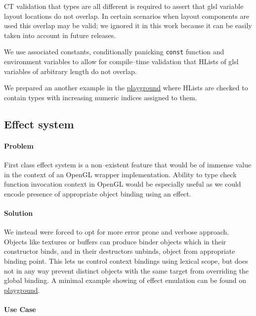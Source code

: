 CT validation that types are all different is required to assert that glsl variable layout locations do not overlap.
In certain scenarios when layout components are used this overlap may be valid; we ignored it in this work because it can be easily taken into account in future releases.

We use associated constants, conditionally panicking \texttt{const} function and environment variables to allow for compile--time validation that HLists of glsl variables 
of arbitrary length do not overlap.

We prepared an another example in the \href{https://play.rust-lang.org/?version=stable&mode=debug&edition=2021&gist=61baf4a1043d947594ef33d03bb8390b}{playground} where
HLists are checked to contain types with increasing numeric indices assigned to them.

\subsection{Effect system}

\paragraph{Problem}

First class effect system is a non--existent feature that would be of immense value in the context of an OpenGL wrapper implementation.
Ability to type check function invocation context in OpenGL would be especially useful as we could encode presence of appropriate object binding using an effect.

\paragraph{Solution}

We instead were forced to opt for more error prone and verbose approach.
Objects like textures or buffers can produce binder objects which in their constructor binds, and in their destructors unbinds, object from appropriate binding point.
This lets us control context bindings using lexical scope, but does not in any way prevent distinct objects with the same target from overriding the global binding.
A minimal example showing of effect emulation can be found on \href{https://play.rust-lang.org/?version=stable&mode=debug&edition=2021&gist=3724852e646ce5d0ed1faf0c57f3e5c1}{playground}.

\paragraph{Use Case}


